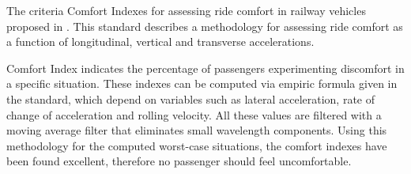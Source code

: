 The criteria Comfort Indexes for assessing ride comfort in railway vehicles proposed in \cite{12299}. This standard describes a methodology for assessing ride comfort as a function of longitudinal, vertical and transverse accelerations.

Comfort Index indicates the percentage of passengers experimenting discomfort in a specific situation. These indexes can be computed via empiric formula given in the standard, which depend on variables such as lateral acceleration, rate of change of acceleration and rolling velocity. All these values are filtered with a moving average filter that eliminates small wavelength components. Using this methodology for the computed worst-case situations, the comfort indexes have been found excellent, therefore no passenger should feel uncomfortable.

